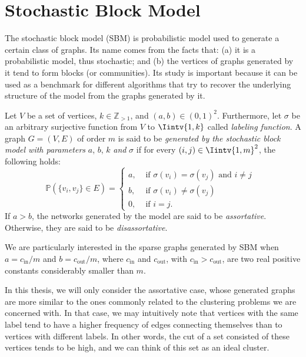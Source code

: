 
\section{Stochastic Block Model}
The stochastic block model (SBM) is probabilistic model used to generate a certain class of graphs.
Its name comes from the facts that: (a) it is a probabilistic model, thus stochastic; and (b) the vertices of graphs generated by it tend to form blocks (or communities).
Its study is important because it can be used as a benchmark for different algorithms that try to recover the underlying structure of the model from the graphs generated by it.

\begin{definition}
   Let $V$ be a set of vertices, $k \in \mathbb Z_{>1}$, and $(a,b) \in (0,1)^2$.
   Furthermore, let $\sigma$ be an arbitrary surjective function from $V$ to $\Iintv{1,k}$ called \textit{labeling function}.
   A graph $G=(V,E)$ of order $m$ is said to be \textit{generated by the stochastic block model with parameters} $a$, $b$, $k$ \textit{and} $\sigma$ if for every $(i,j) \in \Iintv{1,m}^2$, the following holds:
   \begin{equation}
      \mathbb P (\{v_i, v_j\} \in E) =
      \begin{cases}
         a, & \text{ if $\sigma (v_i) = \sigma (v_j)$ and $i \ne j$ } \\
         b, & \text{ if $\sigma (v_i) \ne \sigma (v_j)$ } \\
         0, & \text{ if $i = j$. }
      \end{cases}
   \end{equation}
   If $a > b$, the networks generated by the model are said to be \textit{assortative}. 
   Otherwise, they are said to be \textit{disassortative}. 
\end{definition}

\begin{remark}
   We are particularly interested in the sparse graphs generated by SBM when $a = c_{\text{in}}/m$ and $b = c_{\text{out}}/m$, where $c_\text{in}$ and $c_\text{out}$, with $c_\text{in} > c_\text{out}$, are two real positive constants considerably smaller than $m$. 
\end{remark}

In this thesis, we will only consider the assortative case, whose generated graphs are more similar to the ones commonly related to the clustering problems we are concerned with.
In that case, we may intuitively note that vertices with the same label tend to have a higher frequency of edges connecting themselves than to vertices with different labels.
In other words, the cut of a set consisted of these vertices tends to be high, and we can think of this set as an ideal cluster.

